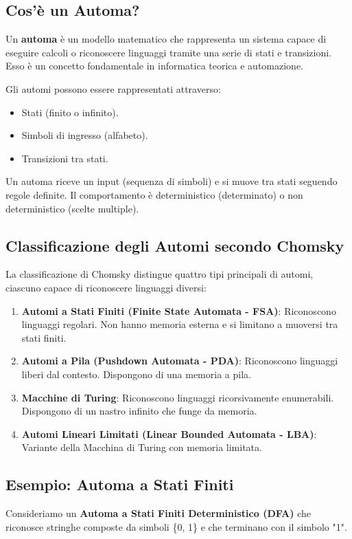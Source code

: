 \documentclass[a4paper,12pt]{report}
\begin{document}
\subsection*{Cos'\`e un Automa?}
Un \textbf{automa} \`e un modello matematico che rappresenta un sistema capace di eseguire calcoli o riconoscere linguaggi tramite una serie di stati e transizioni. Esso \`e un concetto fondamentale in informatica teorica e automazione.

Gli automi possono essere rappresentati attraverso:
\begin{itemize}
    \item Stati (finito o infinito).
    \item Simboli di ingresso (alfabeto).
    \item Transizioni tra stati.
\end{itemize}

Un automa riceve un input (sequenza di simboli) e si muove tra stati seguendo regole definite. Il comportamento \`e deterministico (determinato) o non deterministico (scelte multiple).

\subsection*{Classificazione degli Automi secondo Chomsky}
La classificazione di Chomsky distingue quattro tipi principali di automi, ciascuno capace di riconoscere linguaggi diversi:
\begin{enumerate}
    \item \textbf{Automi a Stati Finiti (Finite State Automata - FSA)}: Riconoscono linguaggi regolari. Non hanno memoria esterna e si limitano a muoversi tra stati finiti.
    \item \textbf{Automi a Pila (Pushdown Automata - PDA)}: Riconoscono linguaggi liberi dal contesto. Dispongono di una memoria a pila.
    \item \textbf{Macchine di Turing}: Riconoscono linguaggi ricorsivamente enumerabili. Dispongono di un nastro infinito che funge da memoria.
    \item \textbf{Automi Lineari Limitati (Linear Bounded Automata - LBA)}: Variante della Macchina di Turing con memoria limitata.
\end{enumerate}

\subsection*{Esempio: Automa a Stati Finiti}
Consideriamo un \textbf{Automa a Stati Finiti Deterministico (DFA)} che riconosce stringhe composte da simboli \{0, 1\} e che terminano con il simbolo "1".
\end{document}
